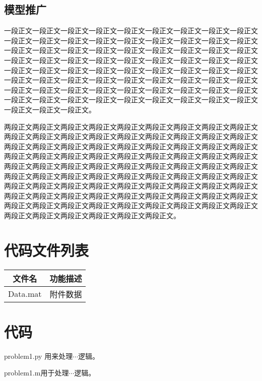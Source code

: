\documentclass{cumcmthesis}
\begin{document}
\subsection{模型推广}
一段正文一段正文一段正文一段正文一段正文一段正文一段正文一段正文一段正文一段正文一段正文一段正文一段正文一段正文一段正文一段正文一段正文一段正文一段正文一段正文一段正文一段正文一段正文一段正文一段正文一段正文一段正文一段正文一段正文一段正文一段正文一段正文一段正文一段正文一段正文一段正文一段正文一段正文一段正文一段正文一段正文一段正文一段正文一段正文一段正文一段正文一段正文一段正文一段正文一段正文一段正文一段正文一段正文一段正文一段正文一段正文一段正文一段正文一段正文一段正文一段正文一段正文一段正文一段正文一段正文一段正文一段正文一段正文一段正文一段正文一段正文一段正文一段正文一段正文一段正文。
\par 两段正文两段正文两段正文两段正文两段正文两段正文两段正文两段正文两段正文两段正文两段正文两段正文两段正文两段正文两段正文两段正文两段正文两段正文两段正文两段正文两段正文两段正文两段正文两段正文两段正文两段正文两段正文两段正文两段正文两段正文两段正文两段正文两段正文两段正文两段正文两段正文两段正文两段正文两段正文两段正文两段正文两段正文两段正文两段正文两段正文两段正文两段正文两段正文两段正文两段正文两段正文两段正文两段正文两段正文两段正文两段正文两段正文两段正文两段正文两段正文两段正文两段正文两段正文两段正文两段正文两段正文两段正文两段正文两段正文两段正文两段正文两段正文两段正文两段正文两段正文两段正文两段正文两段正文两段正文两段正文两段正文两段正文两段正文两段正文两段正文两段正文两段正文。




\newpage
\begin{appendices}
    \section{代码文件列表}
    \begin{table}[htbp]
        \centering
        \begin{tabular}{cc}
            \toprule[1.5pt]
            文件名 & 功能描述 \\
            \midrule
            Data.mat                & 附件数据                         \\
            \bottomrule
        \end{tabular}
    \end{table}
    
    \section{代码}
    problem1.py 用来处理$\cdots$逻辑。
    \par 
    \par problem1.m用于处理$\cdots$逻辑。
    \par 
\end{appendices}
\end{document}
